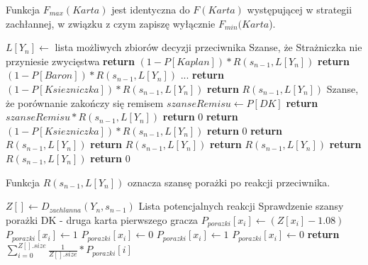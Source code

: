 Funkcja $F_{max}(Karta)$ jest identyczna do $F(Karta)$ występującej w strategii zachłannej, w związku z czym zapiszę wyłącznie $F_{min}(Karta$).
\begin{algorithmic}[1]
		\State $L[Y_n] \gets$ lista możliwych zbiorów decyzji przeciwnika 
			 \Comment Szanse, że Strażniczka nie przyniesie zwycięstwa
				\State \textbf{return} $ (1 - P[Kaplan]) * R(s_{n-1}, L[Y_n]) $
			\EndCase
				\State \textbf{return} $ (1 - P[Baron]) * R(s_{n-1}, L[Y_n]) $
			\EndCase
				\State ...
				\State \textbf{return} $ (1 - P[Ksiezniczka]) * R(s_{n-1}, L[Y_n]) $
			\EndCase
				\State \textbf{return} $  R(s_{n-1}, L[Y_n]) $
			\EndCase
				\Comment Szanse, że porównanie zakończy się remisem 
				\State $ szanseRemisu \gets P[DK]$ 
				\State \textbf{return} $ szanseRemisu * R(s_{n-1}, L[Y_n]) $
			\EndCase
				\State \textbf{return} $ 0 $
			\EndCase
				\State \textbf{return} $ (1 - P[Ksiezniczka]) * R(s_{n-1}, L[Y_n]) $
			\EndCase
					\State \textbf{return} $ 0 $
				\Else
					\State \textbf{return} $ R(s_{n-1}, L[Y_n]) $
				\EndIf
			\EndCase
				\State \textbf{return} $ R(s_{n-1}, L[Y_n]) $
			\EndCase
				\State \textbf{return} $ R(s_{n-1}, L[Y_n]) $
			\EndCase
				\State \textbf{return} $ R(s_{n-1}, L[Y_n]) $
			\EndCase
			\State \textbf{return} $ 0 $
			\EndCase
		\EndSwitch
	\EndFunction
\end{algorithmic}

Funkcja $R(s_{n-1}, L[Y_n])$ oznacza szansę porażki po reakcji przeciwnika.
\begin{algorithmic}[1]
			\State $Z[] \gets D_{zachlanna}(Y_n, s_{n-1}) $	\Comment Lista potencjalnych reakcji
		\EndFor
			\Comment Sprawdzenie szansy porażki
					\Comment DK - druga karta pierwszego gracza
					\State $P_{porazki}[x_i] \gets (Z[x_i] - 1.08)$
				\EndCase
						\State $P_{porazki}[x_i] \gets 1$
					\Else
						\State $P_{porazki}[x_i] \gets 0$
					\EndIf
				\EndCase
						\State $P_{porazki}[x_i] \gets 1$
					\Else
						\State $P_{porazki}[x_i] \gets 0$
					\EndIf
				\EndCase
			\EndSwitch
		\EndFor
		\State \textbf{return} $ \sum_{i=0}^{Z[].size} \frac{1}{Z[].size} * P_{porazki}[i] $
	\EndFunction
\end{algorithmic}

